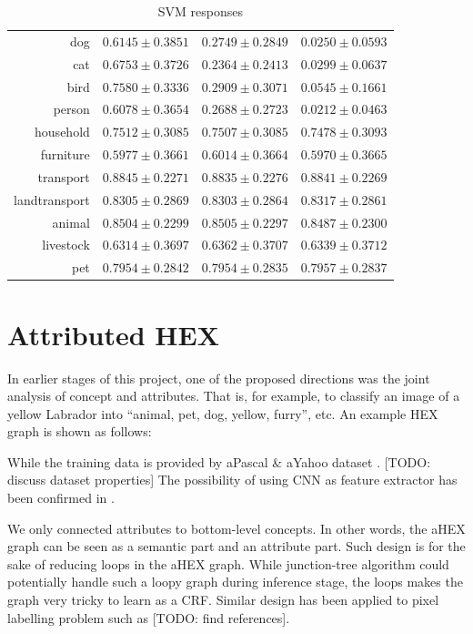 \documentclass[11pt,a4paper]{article}
\begin{document}
\begin{table}[htbp]
\begin{tabular}{r|c|c|c}
dog           & $0.6145\pm0.3851$ & $0.2749\pm0.2849$ & $0.0250\pm0.0593$\\
cat           & $0.6753\pm0.3726$ & $0.2364\pm0.2413$ & $0.0299\pm0.0637$\\
bird          & $0.7580\pm0.3336$ & $0.2909\pm0.3071$ & $0.0545\pm0.1661$\\
person        & $0.6078\pm0.3654$ & $0.2688\pm0.2723$ & $0.0212\pm0.0463$\\\hline
household     & $0.7512\pm0.3085$ & $0.7507\pm0.3085$ & $0.7478\pm0.3093$\\
furniture     & $0.5977\pm0.3661$ & $0.6014\pm0.3664$ & $0.5970\pm0.3665$\\
transport     & $0.8845\pm0.2271$ & $0.8835\pm0.2276$ & $0.8841\pm0.2269$\\
landtransport & $0.8305\pm0.2869$ & $0.8303\pm0.2864$ & $0.8317\pm0.2861$\\
animal        & $0.8504\pm0.2299$ & $0.8505\pm0.2297$ & $0.8487\pm0.2300$\\
livestock     & $0.6314\pm0.3697$ & $0.6362\pm0.3707$ & $0.6339\pm0.3712$\\
pet           & $0.7954\pm0.2842$ & $0.7954\pm0.2835$ & $0.7957\pm0.2837$
\end{tabular}
\caption{SVM responses}
\label{tab:svmresp}
\end{table}

\section{Attributed HEX}

In earlier stages of this project, one of the proposed directions was the joint analysis of concept and attributes. That is, for example, to classify an image of a yellow Labrador into ``animal, pet, dog, yellow, furry'', etc. An example HEX graph is shown as follows:

While the training data is provided by aPascal \& aYahoo dataset \cite{farhadi2009describing}. [TODO: discuss dataset properties] The possibility of using CNN as feature extractor has been confirmed in \cite{razavian2014cnn}.

We only connected attributes to bottom-level concepts. In other words, the aHEX graph can be seen as a semantic part and an attribute part. Such design is for the sake of reducing loops in the aHEX graph. While junction-tree algorithm could potentially handle such a loopy graph during inference stage, the loops makes the graph very tricky to learn as a CRF. Similar design has been applied to pixel labelling problem such as [TODO: find references].
\end{document}
